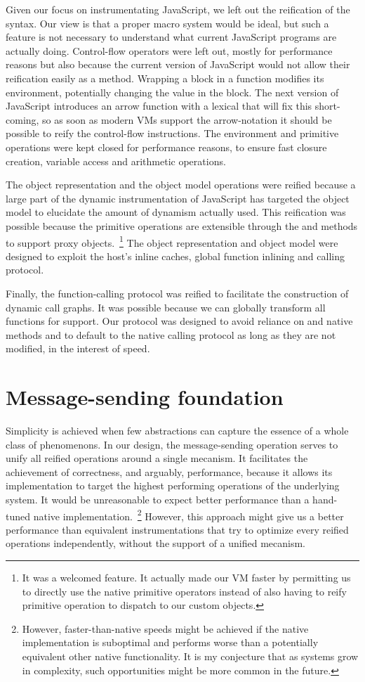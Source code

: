 Given our focus on instrumentating JavaScript, we left out the reification of
the syntax. Our view is that a proper macro system would be ideal, but such a
feature is not necessary to understand what current JavaScript programs are
actually doing. Control-flow operators were left out, mostly for performance
reasons but also because the current version of JavaScript would not allow
their reification easily as a method. Wrapping a block in a function modifies
its environment, potentially changing the  value in the block. The
next version of JavaScript introduces an arrow function with a lexical
 that will fix this short-coming, so as soon as modern VMs support the
arrow-notation it should be possible to reify the control-flow instructions.
The environment and primitive operations were kept closed for performance
reasons, to ensure fast closure creation, variable access and arithmetic
operations.

The object representation and the object model operations were reified because
a large part of the dynamic instrumentation of JavaScript has targeted the
object model to elucidate the amount of dynamism actually used. This
reification was possible because the primitive operations are extensible
through the  and  methods to support proxy
objects.~\footnote{It was a welcomed feature. It actually made our VM faster by
permitting us to directly use the native primitive operators instead of also
having to reify primitive operation to dispatch to our custom objects.} The
object representation and object model were designed to exploit the host's
inline caches, global function inlining and calling protocol.  

Finally, the function-calling protocol was reified to facilitate the
construction of dynamic call graphs. It was possible because we can globally
transform all functions for support. Our protocol was designed to avoid
reliance on  and  native methods and to default to the
native calling protocol as long as they are not modified, in the interest of
speed.

\section{Message-sending foundation}
Simplicity is achieved when few abstractions can capture the essence of a whole
class of phenomenons. In our design, the message-sending operation serves to
unify all reified operations around a single mecanism. It facilitates the
achievement of correctness, and arguably, performance, because it allows its
implementation to target the highest performing operations of the underlying
system. It would be unreasonable to expect better performance than a hand-tuned
native implementation.~\footnote{However, faster-than-native
speeds might be achieved if the native implementation is suboptimal and performs
worse than a potentially equivalent other native functionality. It is my
conjecture that as systems grow in complexity, such opportunities might be
more common in the future.} However, this approach might give us a better
performance than equivalent instrumentations that try to optimize every reified
operations independently, without the support of a unified mecanism.

